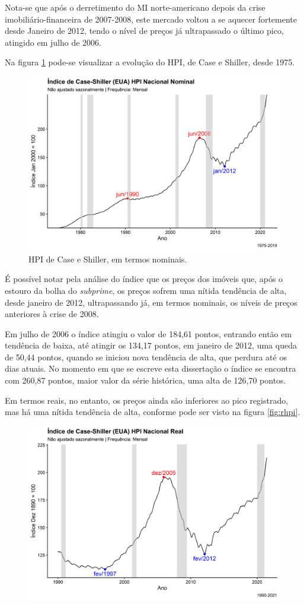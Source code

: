 \documentclass[
	12pt,				%
	oneside,			%
	a4paper,			%
	chapter=TITLE,		%
	section=TITLE,		%
	english,			%
	brazil				%
	]{abntex2}
\begin{document}
\begin{refsection}
Nota-se que após o derretimento do \gls{MI} norte-americano depois da crise
imobiliário-financeira de 2007-2008, este mercado voltou a se aquecer fortemente
desde Janeiro de 2012, tendo o nível de preços já ultrapassado o último pico,
atingido em julho de 2006.

Na figura \ref{fig:nhpi1} pode-se visualizar a evolução do \gls{HPI}, de Case e
Shiller, desde 1975.
\begin{figure}[H]

{\centering \includegraphics[width=0.7\linewidth]{images/nhpi1-1} 

}

\caption{\gls{HPI} de Case e Shiller, em termos nominais.}\label{fig:nhpi1}
\end{figure}
É possível notar pela análise do índice que os preços dos imóveis que, após o
estouro da bolha do \emph{subprime}, os preços sofrem uma nítida tendência de
alta, desde janeiro de 2012, ultrapassando já, em termos nominais, os níveis de
preços anteriores à crise de 2008.

Em julho de 2006 o índice atingiu o valor de 184,61
pontos, entrando então em tendência de baixa, até atingir os
134,17 pontos, em janeiro de 2012, uma queda de
50,44
pontos, quando se iniciou nova tendência de alta, que perdura até os dias atuais.
No momento em que se escreve esta dissertação o índice se encontra com
260,87 pontos, maior valor da série histórica, uma alta de
126,70
pontos.

Em termos reais, no entanto, os preços ainda são inferiores ao pico registrado,
mas há uma nítida tendência de alta, conforme pode ser visto na figura
\ref{fig:rhpi}.
\begin{figure}[H]

{\centering \includegraphics[width=0.7\linewidth]{images/rhpi1-1} 

}
\end{figure}
\end{refsection}
\end{document}
